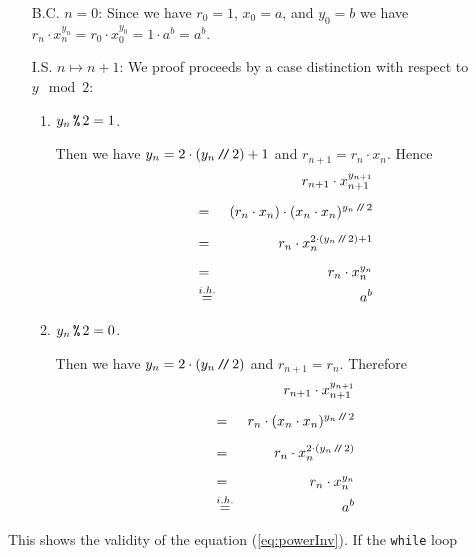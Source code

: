 \begin{enumerate}
\item[B.C.] $n=0$: Since we have $r_0 = 1$, $x_0 = a$, and $y_0 = b$ we have 
            \\[0.2cm]
            \hspace*{1.3cm}
            $r_n \cdot x_n^{y_n} = r_0 \cdot x_0^{y_0} = 1 \cdot a^{b} = a^b$.
\item[I.S.] $n \mapsto n + 1$:  We proof proceeds by a case distinction with respect to $y \mod 2$:
            \begin{enumerate}
            \item $y_n \,\texttt{\%}\, 2 = 1$.

                  Then we have $y_{n} = 2 \cdot (y_n\mbox{\,\texttt{/}$\!$\texttt{/}\,} 2) + 1$ and
                  $r_{n+1} = r_n \cdot x_n$.  Hence
                  \begin{eqnarray*}
                      &   & r_{n+1} \cdot x_{n+1}^{y_{n+1}} \\[0.2cm] 
                      & = & (r_{n} \cdot x_n) \cdot (x_{n} \cdot x_{n})^{y_{n}\mbox{\scriptsize\,\texttt{/}$\!$\texttt{/}\,} 2} \\[0.2cm] 
                      & = & r_{n} \cdot x_n^{2 \cdot (y_{n}\mbox{\scriptsize\,\texttt{/}$\!$\texttt{/}\,} 2) + 1} \\[0.2cm] 
                      & = & r_{n} \cdot x_n^{y_n} \\
                      & \stackrel{i.h.}{=} & a^{b} 
                  \end{eqnarray*}

            \item $y_n \,\texttt{\%}\, 2 = 0$.

                  Then we have $y_{n} = 2 \cdot (y_n\mbox{\,\texttt{/}$\!$\texttt{/}\,} 2)$ and $r_{n+1} = r_n$.
                  Therefore
                  \begin{eqnarray*}
                      &   & r_{n+1} \cdot x_{n+1}^{y_{n+1}} \\[0.2cm] 
                      & = & r_{n} \cdot (x_{n} \cdot x_{n})^{y_{n}\mbox{\scriptsize\,\texttt{/}$\!$\texttt{/}\,} 2} \\[0.2cm] 
                      & = & r_{n} \cdot x_n^{2 \cdot (y_{n} \mbox{\scriptsize\,\texttt{/}$\!$\texttt{/}\,} 2)} \\[0.2cm] 
                      & = & r_{n} \cdot x_n^{y_n} \\
                      & \stackrel{i.h.}{=} & a^{b} 
                  \end{eqnarray*}
            \end{enumerate}
\end{enumerate}
This shows the validity of the equation (\ref{eq:powerInv}).   If the \texttt{while} loop
